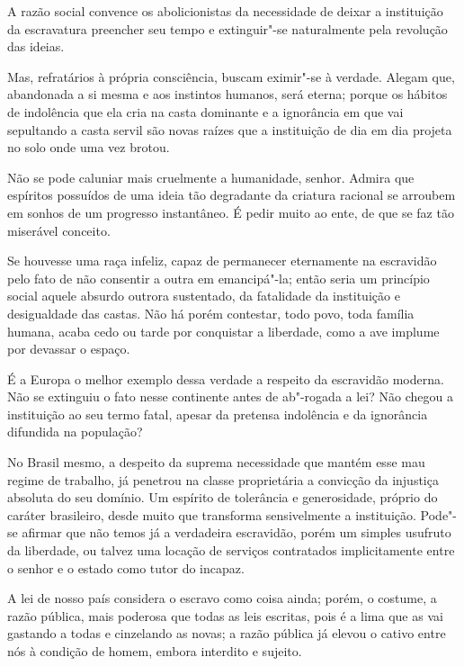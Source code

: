 \begin{linenumbers}

A razão social convence os abolicionistas da necessidade de deixar a
instituição da escravatura preencher seu tempo e extinguir"-se
naturalmente pela revolução das ideias.

Mas, refratários à própria consciência, buscam eximir"-se à verdade.
Alegam que, abandonada a si mesma e aos instintos humanos, será eterna;
porque os hábitos de indolência que ela cria na casta dominante e a
ignorância em que vai sepultando a casta servil são novas raízes que a
instituição de dia em dia projeta no solo onde uma vez brotou.

Não se pode caluniar mais cruelmente a humanidade, senhor. Admira que
espíritos possuídos de uma ideia tão degradante da criatura racional se
arroubem em sonhos de um progresso instantâneo. É pedir muito ao ente,
de que se faz tão miserável conceito.

Se houvesse uma raça infeliz, capaz de permanecer eternamente na
escravidão pelo fato de não consentir a outra em emancipá"-la; então
seria um princípio social aquele absurdo outrora sustentado, da
fatalidade da instituição e desigualdade das castas. Não há porém
contestar, todo povo, toda família humana, acaba cedo ou tarde por
conquistar a liberdade, como a ave implume por devassar o espaço. \label{implume}

É a Europa o melhor exemplo dessa verdade a respeito da escravidão
moderna. Não se extinguiu o fato nesse continente antes de ab"-rogada
a lei? Não chegou a instituição ao seu termo fatal, apesar da pretensa
indolência e da ignorância difundida na população?

No Brasil mesmo, a despeito da suprema necessidade que mantém esse mau
regime de trabalho, já penetrou na classe proprietária a convicção da
injustiça absoluta do seu domínio. Um espírito de tolerância e
generosidade, próprio do caráter brasileiro, desde muito que transforma
sensivelmente a instituição. Pode"-se afirmar que não temos já a
verdadeira escravidão, porém um simples usufruto da liberdade, ou
talvez uma locação de serviços contratados implicitamente entre o
senhor e o estado como tutor do incapaz. 

A lei de nosso país considera o escravo como coisa ainda; porém, o
costume, a razão pública, mais poderosa que todas as leis escritas,
pois é a lima que as vai gastando a todas e cinzelando as novas; a
razão pública já elevou o cativo entre nós à condição de homem, embora
interdito e sujeito.


\end{linenumbers}
